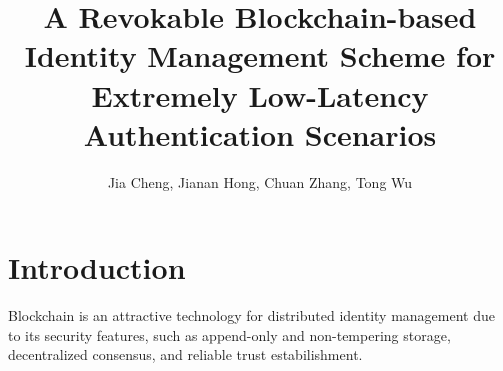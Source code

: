 \documentclass{IEEEconf}
\title{A Revokable Blockchain-based Identity Management Scheme for Extremely Low-Latency Authentication Scenarios}
\author{Jia Cheng, Jianan Hong, Chuan Zhang, Tong Wu}
\begin{document}
\maketitle

\section{Introduction}
Blockchain is an attractive technology for distributed identity management due to its security features, such as append-only and non-tempering storage, decentralized consensus, and reliable trust estabilishment.
\end{document}
